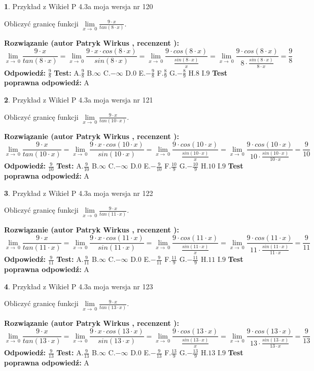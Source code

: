 \documentclass[12pt, a4paper]{article}
\theoremstyle{definition} %
\newtheorem{zad}{}
\newcommand{\zadStart}[1]{\begin{zad}#1\newline}
\newcommand{\zadStop}{\end{zad}}
\newcommand{\rozwStart}[2]{\noindent \textbf{Rozwiązanie (autor #1 , recenzent #2): }\newline}
\newcommand{\rozwStop}{\newline}
\newcommand{\odpStart}{\noindent \textbf{Odpowiedź:}\newline}
\newcommand{\odpStop}{\newline}
\newcommand{\testStart}{\noindent \textbf{Test:}\newline}
\newcommand{\testStop}{\newline}
\newcommand{\kluczStart}{\noindent \textbf{Test poprawna odpowiedź:}\newline}
\newcommand{\kluczStop}{\newline}
\begin{document}
\zadStart{Przykład z Wikieł P 4.3a moja wersja nr 120}


Obliczyć granicę funkcji $\lim\limits_{x\to\ 0}\frac{9 \cdot x}{tan(8 \cdot x)}$.
\zadStop
\rozwStart{Patryk Wirkus}{}
$$\lim\limits_{x\to\ 0}\frac{9 \cdot x}{tan(8 \cdot x)}=\lim\limits_{x\to\ 0}\frac{9 \cdot x \cdot cos(8 \cdot x)}{sin(8 \cdot x)}=\lim\limits_{x\to\ 0}\frac{9 \cdot cos(8 \cdot x)}{\frac{sin(8 \cdot x)}{x}}=\lim\limits_{x\to\ 0}\frac{9 \cdot cos(8 \cdot x)}{8 \cdot \frac{sin(8 \cdot x)}{8 \cdot x}} = \frac{9}{8}$$
\rozwStop
\odpStart
$\frac{9}{8}$
\odpStop
\testStart
A.$\frac{9}{8}$
B.$\infty$
C.$-\infty$
D.$0$
E.$-\frac{9}{8}$
F.$\frac{8}{9}$
G.$-\frac{8}{9}$
H.$8$
I.$9$
\testStop
\kluczStart
A
\kluczStop



\zadStart{Przykład z Wikieł P 4.3a moja wersja nr 121}


Obliczyć granicę funkcji $\lim\limits_{x\to\ 0}\frac{9 \cdot x}{tan(10 \cdot x)}$.
\zadStop
\rozwStart{Patryk Wirkus}{}
$$\lim\limits_{x\to\ 0}\frac{9 \cdot x}{tan(10 \cdot x)}=\lim\limits_{x\to\ 0}\frac{9 \cdot x \cdot cos(10 \cdot x)}{sin(10 \cdot x)}=\lim\limits_{x\to\ 0}\frac{9 \cdot cos(10 \cdot x)}{\frac{sin(10 \cdot x)}{x}}=\lim\limits_{x\to\ 0}\frac{9 \cdot cos(10 \cdot x)}{10 \cdot \frac{sin(10 \cdot x)}{10 \cdot x}} = \frac{9}{10}$$
\rozwStop
\odpStart
$\frac{9}{10}$
\odpStop
\testStart
A.$\frac{9}{10}$
B.$\infty$
C.$-\infty$
D.$0$
E.$-\frac{9}{10}$
F.$\frac{10}{9}$
G.$-\frac{10}{9}$
H.$10$
I.$9$
\testStop
\kluczStart
A
\kluczStop



\zadStart{Przykład z Wikieł P 4.3a moja wersja nr 122}


Obliczyć granicę funkcji $\lim\limits_{x\to\ 0}\frac{9 \cdot x}{tan(11 \cdot x)}$.
\zadStop
\rozwStart{Patryk Wirkus}{}
$$\lim\limits_{x\to\ 0}\frac{9 \cdot x}{tan(11 \cdot x)}=\lim\limits_{x\to\ 0}\frac{9 \cdot x \cdot cos(11 \cdot x)}{sin(11 \cdot x)}=\lim\limits_{x\to\ 0}\frac{9 \cdot cos(11 \cdot x)}{\frac{sin(11 \cdot x)}{x}}=\lim\limits_{x\to\ 0}\frac{9 \cdot cos(11 \cdot x)}{11 \cdot \frac{sin(11 \cdot x)}{11 \cdot x}} = \frac{9}{11}$$
\rozwStop
\odpStart
$\frac{9}{11}$
\odpStop
\testStart
A.$\frac{9}{11}$
B.$\infty$
C.$-\infty$
D.$0$
E.$-\frac{9}{11}$
F.$\frac{11}{9}$
G.$-\frac{11}{9}$
H.$11$
I.$9$
\testStop
\kluczStart
A
\kluczStop



\zadStart{Przykład z Wikieł P 4.3a moja wersja nr 123}


Obliczyć granicę funkcji $\lim\limits_{x\to\ 0}\frac{9 \cdot x}{tan(13 \cdot x)}$.
\zadStop
\rozwStart{Patryk Wirkus}{}
$$\lim\limits_{x\to\ 0}\frac{9 \cdot x}{tan(13 \cdot x)}=\lim\limits_{x\to\ 0}\frac{9 \cdot x \cdot cos(13 \cdot x)}{sin(13 \cdot x)}=\lim\limits_{x\to\ 0}\frac{9 \cdot cos(13 \cdot x)}{\frac{sin(13 \cdot x)}{x}}=\lim\limits_{x\to\ 0}\frac{9 \cdot cos(13 \cdot x)}{13 \cdot \frac{sin(13 \cdot x)}{13 \cdot x}} = \frac{9}{13}$$
\rozwStop
\odpStart
$\frac{9}{13}$
\odpStop
\testStart
A.$\frac{9}{13}$
B.$\infty$
C.$-\infty$
D.$0$
E.$-\frac{9}{13}$
F.$\frac{13}{9}$
G.$-\frac{13}{9}$
H.$13$
I.$9$
\testStop
\kluczStart
A
\kluczStop
\end{document}
